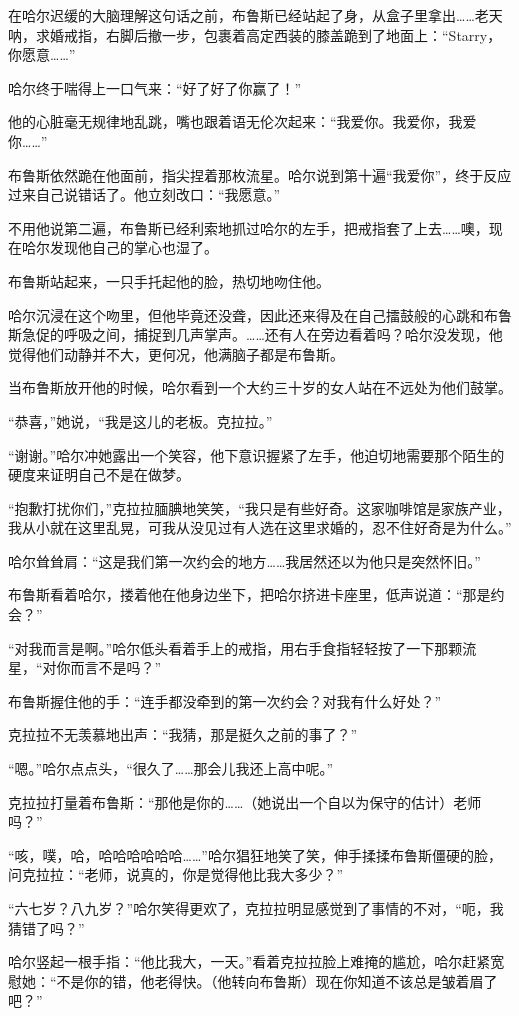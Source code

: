 \documentclass[../main]{subfiles}
\begin{document}
在哈尔迟缓的大脑理解这句话之前，布鲁斯已经站起了身，从盒子里拿出……老天呐，求婚戒指，右脚后撤一步，包裹着高定西装的膝盖跪到了地面上：“Starry，你愿意……”

哈尔终于喘得上一口气来：“好了好了你赢了！”

他的心脏毫无规律地乱跳，嘴也跟着语无伦次起来：“我爱你。我爱你，我爱你……”

布鲁斯依然跪在他面前，指尖捏着那枚流星。哈尔说到第十遍“我爱你”，终于反应过来自己说错话了。他立刻改口：“我愿意。”

不用他说第二遍，布鲁斯已经利索地抓过哈尔的左手，把戒指套了上去……噢，现在哈尔发现他自己的掌心也湿了。

布鲁斯站起来，一只手托起他的脸，热切地吻住他。

哈尔沉浸在这个吻里，但他毕竟还没聋，因此还来得及在自己擂鼓般的心跳和布鲁斯急促的呼吸之间，捕捉到几声掌声。……还有人在旁边看着吗？哈尔没发现，他觉得他们动静并不大，更何况，他满脑子都是布鲁斯。

当布鲁斯放开他的时候，哈尔看到一个大约三十岁的女人站在不远处为他们鼓掌。

“恭喜，”她说，“我是这儿的老板。克拉拉。”

“谢谢。”哈尔冲她露出一个笑容，他下意识握紧了左手，他迫切地需要那个陌生的硬度来证明自己不是在做梦。

“抱歉打扰你们，”克拉拉腼腆地笑笑，“我只是有些好奇。这家咖啡馆是家族产业，我从小就在这里乱晃，可我从没见过有人选在这里求婚的，忍不住好奇是为什么。”

哈尔耸耸肩：“这是我们第一次约会的地方……我居然还以为他只是突然怀旧。”

布鲁斯看着哈尔，搂着他在他身边坐下，把哈尔挤进卡座里，低声说道：“那是约会？”

“对我而言是啊。”哈尔低头看着手上的戒指，用右手食指轻轻按了一下那颗流星，“对你而言不是吗？”

布鲁斯握住他的手：“连手都没牵到的第一次约会？对我有什么好处？”

克拉拉不无羡慕地出声：“我猜，那是挺久之前的事了？”

“嗯。”哈尔点点头，“很久了……那会儿我还上高中呢。”

克拉拉打量着布鲁斯：“那他是你的……（她说出一个自以为保守的估计）老师吗？”

“咳，噗，哈，哈哈哈哈哈哈……”哈尔猖狂地笑了笑，伸手揉揉布鲁斯僵硬的脸，问克拉拉：“老师，说真的，你是觉得他比我大多少？”

“六七岁？八九岁？”哈尔笑得更欢了，克拉拉明显感觉到了事情的不对，“呃，我猜错了吗？”

哈尔竖起一根手指：“他比我大，一天。”看着克拉拉脸上难掩的尴尬，哈尔赶紧宽慰她：“不是你的错，他老得快。（他转向布鲁斯）现在你知道不该总是皱着眉了吧？”
\end{document}
